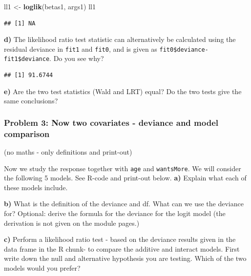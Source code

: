 \documentclass[
]{article}
\newenvironment{Shaded}{\begin{snugshade}}{\end{snugshade}}
\newcommand{\FunctionTok}[1]{\textcolor[rgb]{0.13,0.29,0.53}{\textbf{#1}}}
\newcommand{\NormalTok}[1]{#1}
\newcommand{\OtherTok}[1]{\textcolor[rgb]{0.56,0.35,0.01}{#1}}
\newcommand{\SpecialCharTok}[1]{\textcolor[rgb]{0.81,0.36,0.00}{\textbf{#1}}}
\begin{document}
\begin{Shaded}
\begin{Highlighting}[]
\NormalTok{ll1 }\OtherTok{\textless{}{-}} \FunctionTok{loglik}\NormalTok{(betas1, args1)}
\NormalTok{ll1}
\end{Highlighting}
\end{Shaded}

\begin{verbatim}
## [1] NA
\end{verbatim}

\textbf{d)} The likelihood ratio test statistic can alternatively be
calculated using the residual deviance in \texttt{fit1} and
\texttt{fit0}, and is given as \texttt{fit0\$deviance-fit1\$deviance}.
Do you see why?

\begin{Shaded}
\end{Shaded}

\begin{verbatim}
## [1] 91.6744
\end{verbatim}

\textbf{e)} Are the two test statistics (Wald and LRT) equal? Do the two
tests give the same conclusions?

\hypertarget{problem-3-now-two-covariates---deviance-and-model-comparison}{%
\subsubsection{Problem 3: Now two covariates - deviance and model
comparison}\label{problem-3-now-two-covariates---deviance-and-model-comparison}}

(no maths - only definitions and print-out)

Now we study the response together with \texttt{age} and
\texttt{wantsMore}. We will consider the following 5 models. See R-code
and print-out below. \textbf{a)} Explain what each of these models
include.

\textbf{b)} What is the definition of the deviance and df. What can we
use the deviance for? Optional: derive the formula for the deviance for
the logit model (the derivation is not given on the module pages.)

\textbf{c)} Perform a likelihood ratio test - based on the deviance
results given in the data frame in the R chunk- to compare the additive
and interact models. First write down the null and alternative
hypothesis you are testing. Which of the two models would you prefer?
\end{document}
